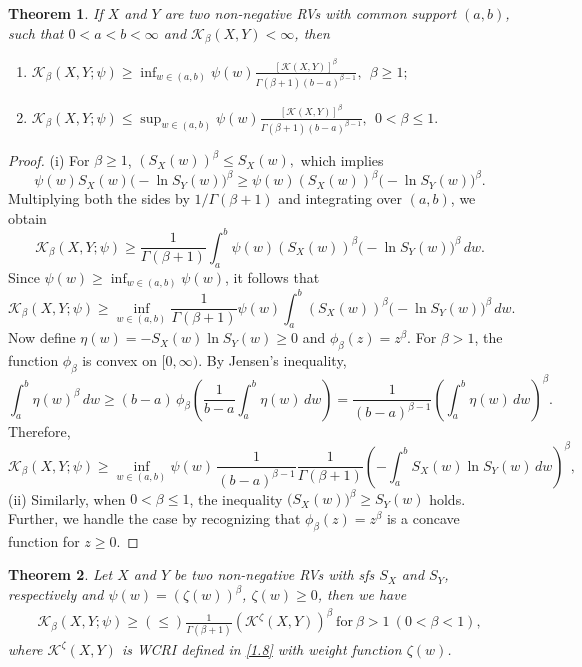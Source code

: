 \documentclass[12pt,a4paper]{article}
\numberwithin{equation}{section}
\newtheorem{theorem}{Theorem}[section]
\begin{document}
	\begin{theorem}
		If $X$ and $Y$ are two non-negative RVs with common support $(a,b)$, such that $0<a<b<\infty$ and $\mathcal K_\beta(X,Y)<\infty$, then 
			\begin{enumerate}
				\item [(i)]		$	\mathcal K_\beta(X, Y;\psi)\geq \inf_{w\in(a,b)}\psi(w)\frac{[\mathcal    {K}(X,Y)]^\beta}{\Gamma{(\beta+1)}(b-a)^{\beta-1}},~~\beta\geq 1;$
				\item[(ii)]	$\mathcal K_\beta(X, Y;\psi)\leq \sup_{w\in(a,b)}\psi(w)\frac{[\mathcal K(X,Y)]^\beta}{\Gamma(\beta+1)(b-a)^{\beta-1}},~~0<\beta\leq 1.$
				\end{enumerate}
	\end{theorem}	
	\begin{proof}
	(i)	For $\beta \ge 1$, $(S_X(w))^\beta \le S_X(w),$
		which implies
		\[
		\psi(w)S_X(w)\big(-\ln S_Y(w)\big)^\beta 
		\ge \psi(w)(S_X(w))^\beta\big(-\ln S_Y(w)\big)^\beta.
		\]
		Multiplying both the sides by $1/\Gamma(\beta+1)$ and integrating over $(a,b)$, we obtain
		\[
		\mathcal{K}_\beta(X,Y;\psi)
		\ge\frac{1}{\Gamma(\beta+1)} \int_a^b \psi(w)(S_X(w))^\beta\big(-\ln S_Y(w)\big)^\beta\,dw.
		\]
		Since $\psi(w)\ge \inf_{w\in(a,b)}\psi(w)$, it follows that
		\[
		\mathcal{K}_\beta(X,Y;\psi)
		\ge \inf_{w\in(a,b)}\frac{1}{\Gamma(\beta+1)}\psi(w)\int_a^b (S_X(w))^\beta\big(-\ln S_Y(w)\big)^\beta\,dw.
		\]
		Now define $\eta(w)=-S_X(w)\ln S_Y(w)\ge 0$ and $\phi_\beta(z)=z^\beta$.  
		For $\beta>1$, the function $\phi_\beta$ is convex on $[0,\infty)$.  
		By Jensen's inequality,
		\[
		\int_a^b \eta(w)^\beta\,dw
		\ge (b-a)\,\phi_\beta\!\left(\frac{1}{b-a}\int_a^b \eta(w)\,dw\right)
		= \frac{1}{(b-a)^{\beta-1}}\left(\int_a^b \eta(w)\,dw\right)^\beta.
		\]
		Therefore,
		\[
		\mathcal{K}_\beta(X,Y;\psi)
		\ge \inf_{w\in(a,b)}\psi(w)\,
		\frac{1}{(b-a)^{\beta-1}}\frac{1}{\Gamma(\beta+1)}
		\left(-\int_a^b S_X(w)\ln S_Y(w)\,dw\right)^\beta,
		\]
(ii)	Similarly, when $0 < \beta \leq 1$, the inequality
$
\big(S_X(w)\big)^\beta \geq S_Y(w)
$
holds.   Further, we handle the case by recognizing that $\phi_\beta(z) = z^\beta$ is a concave function for $z \geq 0$.  
	\end{proof}
	\begin{theorem}
		Let $X$ and $Y$ be two non-negative RVs with sfs $S_X$ and $S_Y$, respectively and $\psi(w)=\left(\zeta(w)\right)^\beta$,  $\zeta(w)\geq 0$, then we have 
		\begin{align*}
		\mathcal K_\beta(X,Y;\psi)\geq(\leq)\frac{1}{\Gamma(\beta+1)} \left(\mathcal K^{\zeta}(X,Y)\right)^\beta~\text{for}~\beta>1~(0<\beta<1),
		\end{align*}
		where $\mathcal K^\zeta(X,Y)$ is WCRI defined in \eqref{1.8} with weight function $\zeta(w)$.
	\end{theorem}
\end{document}
